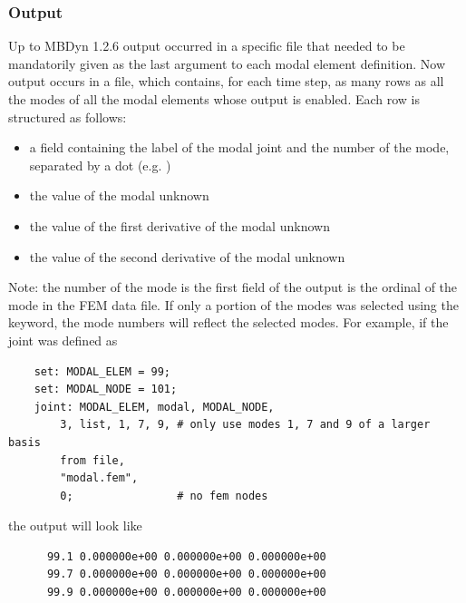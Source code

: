 \subsubsection{Output}
Up to MBDyn 1.2.6 output occurred in a specific file that needed
to be mandatorily given as the last argument to each modal element
definition.
Now output occurs in a  file, which contains, for each time step,
as many rows as all the modes of all the modal elements whose output is enabled.
Each row is structured as follows:
\begin{itemize}
\item a field containing the label of the modal joint and the number of the mode,
separated by a dot (e.g. )
\item the value of the modal unknown
\item the value of the first derivative of the modal unknown
\item the value of the second derivative of the modal unknown
\end{itemize}
Note: the number of the mode is the first field of the output
is the ordinal of the mode in the FEM data file.
If only a portion of the modes was selected using the  keyword,
the mode numbers will reflect the selected modes.
For example, if the  joint was defined as
\begin{verbatim}
    set: MODAL_ELEM = 99;
    set: MODAL_NODE = 101;
    joint: MODAL_ELEM, modal, MODAL_NODE,
        3, list, 1, 7, 9, # only use modes 1, 7 and 9 of a larger basis
        from file,
        "modal.fem",
        0;                # no fem nodes
\end{verbatim}
the output will look like
\begin{verbatim}
      99.1 0.000000e+00 0.000000e+00 0.000000e+00
      99.7 0.000000e+00 0.000000e+00 0.000000e+00
      99.9 0.000000e+00 0.000000e+00 0.000000e+00
\end{verbatim}

